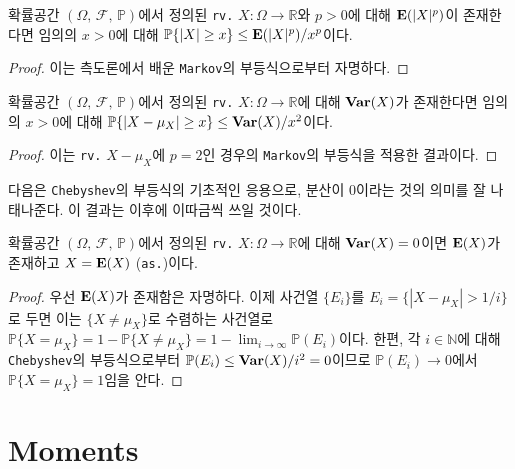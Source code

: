 \begin{theorem}
    확률공간 $(\Omega,\,\mathcal{F},\,\mathbb{P})$에서 정의된 \texttt{rv.} $X:\Omega\to\mathbb{R}$와 $p>0$에 대해 $\mathbf{E}(|X|^p)$이 존재한다면 임의의 $x>0$에 대해 $\mathbb{P}\{|X|\geq x\}\leq\mathbf{E}(|X|^p)/x^p$이다.
\end{theorem}

\begin{proof}
    이는 측도론에서 배운 \texttt{Markov}의 부등식으로부터 자명하다.
\end{proof}

\begin{corollary}
    확률공간 $(\Omega,\,\mathcal{F},\,\mathbb{P})$에서 정의된 \texttt{rv.} $X:\Omega\to\mathbb{R}$에 대해 $\mathbf{Var}(X)$가 존재한다면 임의의 $x>0$에 대해 $\mathbb{P}\{|X-\mu_X|\geq x\}\leq\mathbf{Var}(X)/x^2$이다.
\end{corollary}

\begin{proof}
    이는 \texttt{rv.} $X-\mu_X$에 $p=2$인 경우의 \texttt{Markov}의 부등식을 적용한 결과이다.
\end{proof}

다음은 \texttt{Chebyshev}의 부등식의 기초적인 응용으로, 분산이 $0$이라는 것의 의미를 잘 나태나준다. 이 결과는 이후에 이따금씩 쓰일 것이다.

\begin{proposition}
    확률공간 $(\Omega,\,\mathcal{F},\,\mathbb{P})$에서 정의된 \texttt{rv.} $X:\Omega\to\mathbb{R}$에 대해 $\mathbf{Var}(X)=0$이면 $\mathbf{E}(X)$가 존재하고 $X=\mathbf{E}(X)$ (\texttt{as.})이다.
\end{proposition}

\begin{proof}
    우선 $\mathbf{E}(X)$가 존재함은 자명하다. 이제 사건열 $\{E_i\}$를 $E_i=\{|X-\mu_X|>1/i\}$로 두면 이는 $\{X\ne\mu_X\}$로 수렴하는 사건열로 $\mathbb{P}\{X=\mu_X\}=1-\mathbb{P}\{X\ne\mu_X\}=1-\lim_{i\to\infty}\mathbb{P}(E_i)$이다. 한편, 각 $i\in\mathbb{N}$에 대해 \texttt{Chebyshev}의 부등식으로부터 $\mathbb{P}(E_i)\leq\mathbf{Var}(X)/i^2=0$이므로 $\mathbb{P}(E_i)\to0$에서 $\mathbb{P}\{X=\mu_X\}=1$임을 안다.
\end{proof}

\section{Moments}

